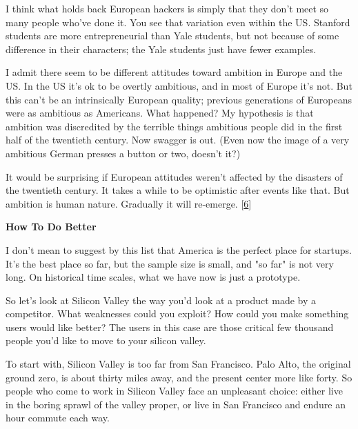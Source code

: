I
                  think what holds back European hackers is simply that they
                  don't meet so many people who've done it. You see that
                  variation even within the US. Stanford students are more
                  entrepreneurial than Yale students, but not because of some
                  difference in their characters; the Yale students just have
                  fewer examples.

I admit there seem to be different
                  attitudes toward ambition in Europe and the US. In the US it's
                  ok to be overtly ambitious, and in most of Europe it's not.
                  But this can't be an intrinsically European quality; previous
                  generations of Europeans were as ambitious as Americans. What
                  happened? My hypothesis is that ambition was discredited by
                  the terrible things ambitious people did in the first half of
                  the twentieth century. Now swagger is out. (Even now the image
                  of a very ambitious German presses a button or two, doesn't
                  it?)

It would be surprising if European attitudes
                  weren't affected by the disasters of the twentieth century. It
                  takes a while to be optimistic after events like that. But
                  ambition is human nature. Gradually it will re-emerge.
                  [\href{\#f6n}{6}]

\textbf{How To Do Better}

I don't mean
                  to suggest by this list that America is the perfect place for
                  startups. It's the best place so far, but the sample size is
                  small, and "so far" is not very long. On historical time
                  scales, what we have now is just a prototype.

So
                  let's look at Silicon Valley the way you'd look at a product
                  made by a competitor. What weaknesses could you exploit? How
                  could you make something users would like better? The users in
                  this case are those critical few thousand people you'd like to
                  move to your silicon valley.

To start with, Silicon
                  Valley is too far from San Francisco. Palo Alto, the original
                  ground zero, is about thirty miles away, and the present
                  center more like forty. So people who come to work in Silicon
                  Valley face an unpleasant choice: either live in the boring
                  sprawl of the valley proper, or live in San Francisco and
                  endure an hour commute each way.

